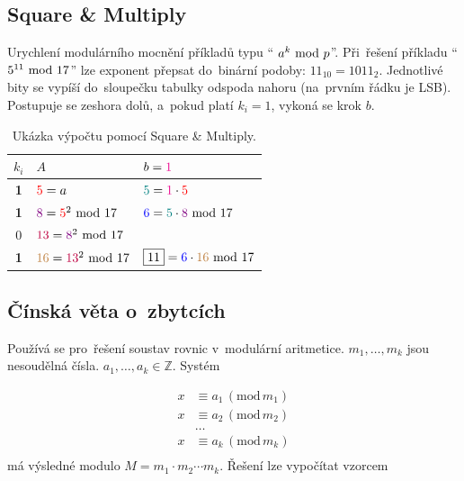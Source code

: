 \subsection{Square \& Multiply}

Urychlení modulárního mocnění příkladů typu \enquote{ $a^k \ \mathrm{mod}\ p$}. Při~řešení příkladu \enquote{$5^{11} \ \mathrm{mod}\ 17$} lze exponent přepsat do~binární podoby: $11_{10} = 1011_2$. Jednotlivé bity se vypíší do~sloupečku tabulky odspoda nahoru (na~prvním řádku je LSB). Postupuje se zeshora dolů, a~pokud platí $k_i = 1$, vykoná se krok $b$.

\begin{table}[ht]
\centering
\begin{tabular}{c|ll}
$k_i$      & $A$                                                & $b = {\color{magenta}1}$ \\
\hline
\textbf{1} & ${\color{red}5} = a$                               & ${\color{teal}5} = {\color{magenta}1} \cdot {\color{red}5}$ \\
\textbf{1} & ${\color{violet}8} = {\color{red}5}^2 \ \mathrm{mod}\ 17$     & ${\color{blue}6} = {\color{teal}5} \cdot {\color{violet}8} \ \mathrm{mod}\ 17$ \\
        0  & ${\color{purple}13} = {\color{violet}8}^2 \ \mathrm{mod}\ 17$ & \\
\textbf{1} & ${\color{brown}16} = {\color{purple}13}^2 \ \mathrm{mod}\ 17$ & $\boxed{11} = {\color{blue}6} \cdot {\color{brown}16} \ \mathrm{mod}\ 17$ \\
\end{tabular}
\caption*{Ukázka výpočtu pomocí Square \& Multiply.}
\end{table} 

\clearpage
\subsection{Čínská věta o~zbytcích}

Používá se pro~řešení soustav rovnic v~modulární aritmetice. $m_1, \dots, m_k$ jsou nesoudělná čísla. $a_1, \dots, a_k \in \mathbb{Z}$. Systém

\begin{align*}
x &\equiv a_1 \,(\mathrm{mod}\, m_1) \\
x &\equiv a_2 \,(\mathrm{mod}\, m_2) \\
&\dots \\
x &\equiv a_k \,(\mathrm{mod}\, m_k) \\
\end{align*} %
má výsledné modulo $M = m_1 \cdot m_2 \cdots m_k$. Řešení lze vypočítat vzorcem

